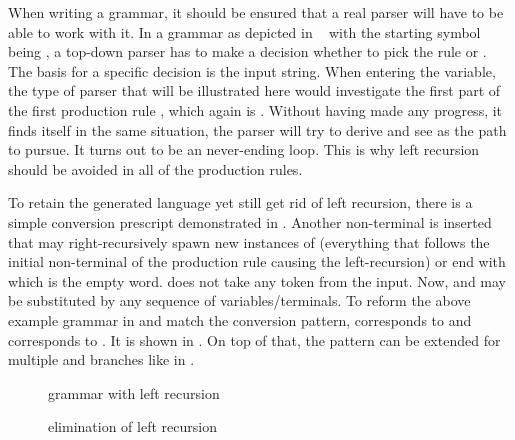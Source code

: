When writing a grammar, it should be ensured that a real parser will have to be able to work with it. In a grammar as depicted in ~ with the starting symbol being , a top-down parser has to make a decision whether to pick the rule  or . The basis for a specific decision is the input string. When entering the  variable, the type of parser that will be illustrated here would investigate the first part of the first production rule , which again is . Without having made any progress, it finds itself in the same situation, the parser will try to derive  and see  as the path to pursue. It turns out to be an never-ending loop. This is why left recursion should be avoided in all of the production rules.

To retain the generated language yet still get rid of left recursion, there is a simple conversion prescript demonstrated in . Another non-terminal is inserted that may right-recursively spawn new instances of \textalpha{} (everything that follows the initial non-terminal of the production rule causing the left-recursion) or end with \straightepsilon{} which is the empty word. \straightepsilon{} does not take any token from the input. Now, \textalpha{} and \textbeta{} may be substituted by any sequence of variables/terminals. To reform the above example grammar in  and match the conversion pattern, \textalpha{} corresponds to \textterminal{+}  and \textbeta{} corresponds to . It is shown in . On top of that, the pattern can be extended for multiple \textalpha{} and \textbeta{} branches like in .

\begin{figure}
	\centering
	
	

	\caption{grammar with left recursion}
	\label{fig:grammar_LR}
\end{figure}

\FloatBarrier

\begin{figure}
	\centering

	

	\caption{elimination of left recursion}
	\label{fig:grammar_elimLR}
\end{figure}

